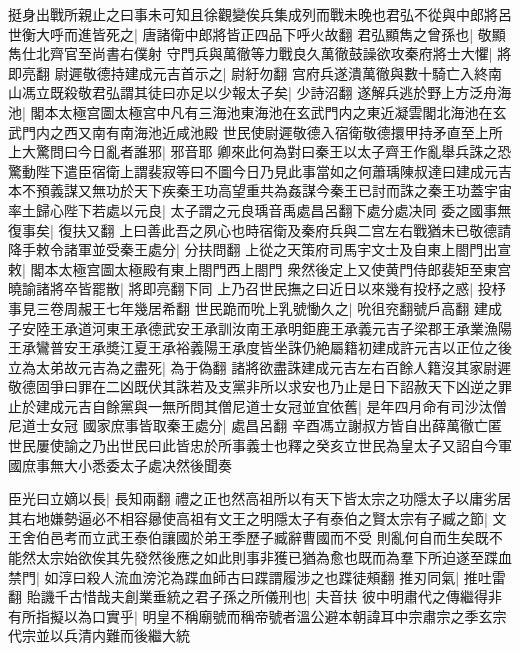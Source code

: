 挺身出戰所親止之曰事未可知且徐觀變俟兵集成列而戰未晚也君弘不從與中郎將呂世衡大呼而進皆死之|{
	唐諸衛中郎將皆正四品下呼火故翻}
君弘顯雋之曾孫也|{
	敬顯雋仕北齊官至尚書右僕射}
守門兵與萬徹等力戰良久萬徹鼓譟欲攻秦府將士大懼|{
	將即亮翻}
尉遲敬德持建成元吉首示之|{
	尉紆勿翻}
宫府兵遂潰萬徹與數十騎亡入終南山馮立既殺敬君弘謂其徒曰亦足以少報太子矣|{
	少詩沼翻}
遂解兵逃於野上方泛舟海池|{
	閣本太極宫圖太極宫中凡有三海池東海池在玄武門内之東近凝雲閣北海池在玄武門内之西又南有南海池近咸池殿}
世民使尉遲敬德入宿衛敬德擐甲持矛直至上所上大驚問曰今日亂者誰邪|{
	邪音耶}
卿來此何為對曰秦王以太子齊王作亂舉兵誅之恐驚動陛下遣臣宿衛上謂裴寂等曰不圖今日乃見此事當如之何蕭瑀陳叔達曰建成元吉本不預義謀又無功於天下疾秦王功高望重共為姦謀今秦王已討而誅之秦王功蓋宇宙率土歸心陛下若處以元良|{
	太子謂之元良瑀音禹處昌呂翻下處分處决同}
委之國事無復事矣|{
	復扶又翻}
上曰善此吾之夙心也時宿衛及秦府兵與二宫左右戰猶未已敬德請降手敕令諸軍並受秦王處分|{
	分扶問翻}
上從之天策府司馬宇文士及自東上閤門出宣敕|{
	閣本太極宫圖太極殿有東上閤門西上閤門}
衆然後定上又使黄門侍郎裴矩至東宫曉諭諸將卒皆罷散|{
	將即亮翻下同}
上乃召世民撫之曰近日以來幾有投杼之惑|{
	投杼事見三卷周赧王七年幾居希翻}
世民跪而吮上乳號慟久之|{
	吮徂兖翻號戶高翻}
建成子安陸王承道河東王承德武安王承訓汝南王承明鉅鹿王承義元吉子梁郡王承業漁陽王承鸞普安王承奬江夏王承裕義陽王承度皆坐誅仍絶屬籍初建成許元吉以正位之後立為太弟故元吉為之盡死|{
	為于偽翻}
諸將欲盡誅建成元吉左右百餘人籍沒其家尉遲敬德固爭曰罪在二凶既伏其誅若及支黨非所以求安也乃止是日下詔赦天下凶逆之罪止於建成元吉自餘黨與一無所問其僧尼道士女冠並宜依舊|{
	是年四月命有司沙汰僧尼道士女冠}
國家庶事皆取秦王處分|{
	處昌呂翻}
辛酉馮立謝叔方皆自出薛萬徹亡匿世民屢使諭之乃出世民曰此皆忠於所事義士也釋之癸亥立世民為皇太子又詔自今軍國庶事無大小悉委太子處决然後聞奏

臣光曰立嫡以長|{
	長知兩翻}
禮之正也然高祖所以有天下皆太宗之功隱太子以庸劣居其右地嫌勢逼必不相容曏使高祖有文王之明隱太子有泰伯之賢太宗有子臧之節|{
	文王舍伯邑考而立武王泰伯讓國於弟王季歷子臧辭曹國而不受}
則亂何自而生矣既不能然太宗始欲俟其先發然後應之如此則事非獲已猶為愈也既而為羣下所迫遂至蹀血禁門|{
	如淳曰殺人流血滂沱為蹀血師古曰蹀謂履涉之也蹀徒頰翻}
推刃同氣|{
	推吐雷翻}
貽譏千古惜哉夫創業垂統之君子孫之所儀刑也|{
	夫音扶}
彼中明肅代之傳繼得非有所指擬以為口實乎|{
	明皇不稱廟號而稱帝號者溫公避本朝諱耳中宗肅宗之季玄宗代宗並以兵清内難而後繼大統}


